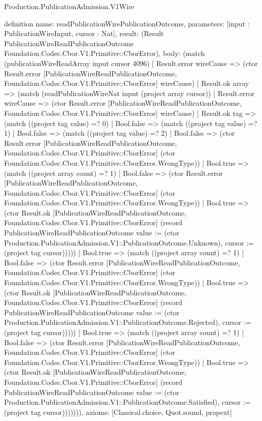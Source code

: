 \begin{lexlean}{Production.PublicationAdmission.V1Wire}
\begin{semanticmodule}
definition{
  name: readPublicationWirePublicationOutcome,
  parameters: [input : PublicationWireInput, cursor : Nat],
  result: (Result PublicationWireReadPublicationOutcome Foundation.Codec.Cbor.V1.Primitive::CborError),
  body: (match (publicationWireReadArray input cursor 4096)
    | Result.error wireCause => (ctor Result.error [PublicationWireReadPublicationOutcome, Foundation.Codec.Cbor.V1.Primitive::CborError] wireCause)
    | Result.ok array => (match (readPublicationWireNat input (project array cursor))
      | Result.error wireCause => (ctor Result.error [PublicationWireReadPublicationOutcome, Foundation.Codec.Cbor.V1.Primitive::CborError] wireCause)
      | Result.ok tag => (match ((project tag value) =? 0)
        | Bool.false => (match ((project tag value) =? 1)
          | Bool.false => (match ((project tag value) =? 2)
            | Bool.false => (ctor Result.error [PublicationWireReadPublicationOutcome, Foundation.Codec.Cbor.V1.Primitive::CborError] (ctor Foundation.Codec.Cbor.V1.Primitive::CborError.WrongType))
            | Bool.true => (match ((project array count) =? 1)
              | Bool.false => (ctor Result.error [PublicationWireReadPublicationOutcome, Foundation.Codec.Cbor.V1.Primitive::CborError] (ctor Foundation.Codec.Cbor.V1.Primitive::CborError.WrongType))
              | Bool.true => (ctor Result.ok [PublicationWireReadPublicationOutcome, Foundation.Codec.Cbor.V1.Primitive::CborError] (record PublicationWireReadPublicationOutcome {value := (ctor Production.PublicationAdmission.V1::PublicationOutcome.Unknown), cursor := (project tag cursor)}))))
          | Bool.true => (match ((project array count) =? 1)
            | Bool.false => (ctor Result.error [PublicationWireReadPublicationOutcome, Foundation.Codec.Cbor.V1.Primitive::CborError] (ctor Foundation.Codec.Cbor.V1.Primitive::CborError.WrongType))
            | Bool.true => (ctor Result.ok [PublicationWireReadPublicationOutcome, Foundation.Codec.Cbor.V1.Primitive::CborError] (record PublicationWireReadPublicationOutcome {value := (ctor Production.PublicationAdmission.V1::PublicationOutcome.Rejected), cursor := (project tag cursor)}))))
        | Bool.true => (match ((project array count) =? 1)
          | Bool.false => (ctor Result.error [PublicationWireReadPublicationOutcome, Foundation.Codec.Cbor.V1.Primitive::CborError] (ctor Foundation.Codec.Cbor.V1.Primitive::CborError.WrongType))
          | Bool.true => (ctor Result.ok [PublicationWireReadPublicationOutcome, Foundation.Codec.Cbor.V1.Primitive::CborError] (record PublicationWireReadPublicationOutcome {value := (ctor Production.PublicationAdmission.V1::PublicationOutcome.Satisfied), cursor := (project tag cursor)})))))),
  axioms: [Classical.choice, Quot.sound, propext]
}


\end{semanticmodule}
\end{lexlean}
